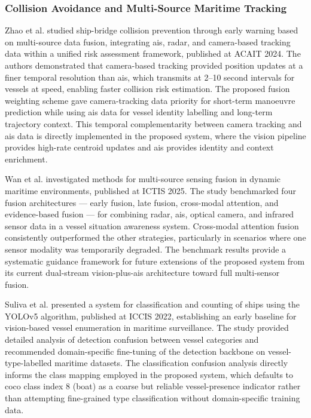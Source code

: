 \subsubsection{\textbf{Collision Avoidance and Multi-Source Maritime Tracking}}
Zhao et al. \cite{Zhao2024} studied ship-bridge collision prevention through early
warning based on multi-source data fusion, integrating \gls{ais}, radar, and camera-based
tracking data within a unified risk assessment framework, published at ACAIT 2024.
The authors demonstrated that camera-based tracking provided position updates at a
finer temporal resolution than \gls{ais}, which transmits at 2--10 second intervals for
vessels at speed, enabling faster collision risk estimation. The proposed fusion
weighting scheme gave camera-tracking data priority for short-term manoeuvre
prediction while using \gls{ais} data for vessel identity labelling and long-term trajectory
context. This temporal complementarity between camera tracking and \gls{ais} data is
directly implemented in the proposed system, where the vision pipeline provides
high-rate centroid updates and \gls{ais} provides identity and context enrichment.
 
Wan et al. \cite{Wan2025} investigated methods for multi-source sensing fusion
in dynamic maritime environments, published at ICTIS 2025. The study benchmarked
four fusion architectures --- early fusion, late fusion, cross-modal attention,
and evidence-based fusion --- for combining radar, \gls{ais}, optical camera, and
infrared sensor data in a vessel situation awareness system. Cross-modal attention
fusion consistently outperformed the other strategies, particularly in scenarios
where one sensor modality was temporarily degraded. The benchmark results provide
a systematic guidance framework for future extensions of the proposed system from
its current dual-stream vision-plus-\gls{ais} architecture toward full multi-sensor
fusion.
 
Suliva et al. \cite{Suliva2022} presented a system for classification and counting
of ships using the YOLOv5 algorithm, published at ICCIS 2022, establishing an
early baseline for vision-based vessel enumeration in maritime surveillance. The
study provided detailed analysis of detection confusion between vessel categories
and recommended domain-specific fine-tuning of the detection backbone on
vessel-type-labelled maritime datasets. The classification confusion analysis
directly informs the class mapping employed in the proposed system, which defaults
to \gls{coco} class index 8 (boat) as a coarse but reliable vessel-presence indicator
rather than attempting fine-grained type classification without domain-specific
training data.
 
